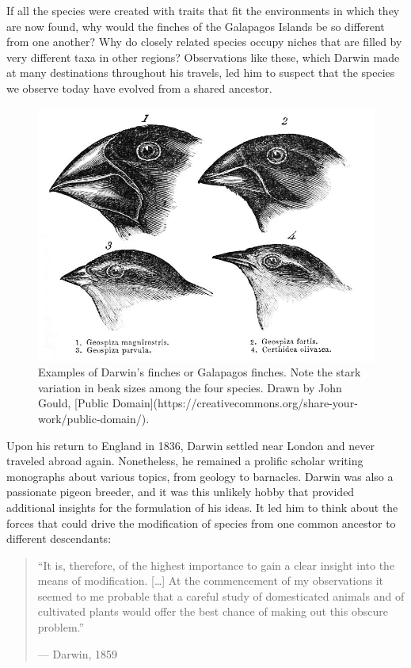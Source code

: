 \documentclass[
]{book}
\begin{document}
If all the species were created with traits that fit the environments in which they are now found, why would the finches of the Galapagos Islands be so different from one another? Why do closely related species occupy niches that are filled by very different taxa in other regions? Observations like these, which Darwin made at many destinations throughout his travels, led him to suspect that the species we observe today have evolved from a shared ancestor.

\begin{figure}
\includegraphics[width=1\linewidth]{images/Darwin_finches} \caption{Examples of Darwin's finches or Galapagos finches. Note the stark variation in beak sizes among the four species. Drawn by John Gould, [Public Domain](https://creativecommons.org/share-your-work/public-domain/).}\label{fig:finches}
\end{figure}

Upon his return to England in 1836, Darwin settled near London and never traveled abroad again. Nonetheless, he remained a prolific scholar writing monographs about various topics, from geology to barnacles. Darwin was also a passionate pigeon breeder, and it was this unlikely hobby that provided additional insights for the formulation of his ideas. It led him to think about the forces that could drive the modification of species from one common ancestor to different descendants:

\begin{quote}
``It is, therefore, of the highest importance to gain a clear insight into the means of modification. {[}\ldots{]} At the commencement of my observations it seemed to me probable that a careful study of domesticated animals and of cultivated plants would offer the best chance of making out this obscure problem.''

--- Darwin, 1859
\end{quote}
\end{document}
